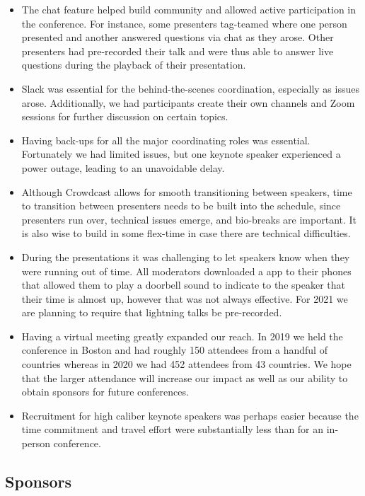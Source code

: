 \begin{itemize}
\item
  The chat feature helped build community and allowed active
  participation in the conference. For instance, some presenters
  tag-teamed where one person presented and another answered questions
  via chat as they arose. Other presenters had pre-recorded their talk
  and were thus able to answer live questions during the playback of
  their presentation.
\item
  Slack was essential for the behind-the-scenes coordination, especially
  as issues arose. Additionally, we had participants create their own
  channels and Zoom sessions for further discussion on certain topics.
\item
  Having back-ups for all the major coordinating roles was essential.
  Fortunately we had limited issues, but one keynote speaker experienced
  a power outage, leading to an unavoidable delay.
\item
  Although Crowdcast allows for smooth transitioning between speakers,
  time to transition between presenters needs to be built into the
  schedule, since presenters run over, technical issues emerge, and
  bio-breaks are important. It is also wise to build in some flex-time
  in case there are technical difficulties.
\item
  During the presentations it was challenging to let speakers know when
  they were running out of time. All moderators downloaded a app to
  their phones that allowed them to play a doorbell sound to indicate to
  the speaker that their time is almost up, however that was not always
  effective. For 2021 we are planning to require that lightning talks be
  pre-recorded.
\item
  Having a virtual meeting greatly expanded our reach. In 2019 we held
  the conference in Boston and had roughly 150 attendees from a handful
  of countries whereas in 2020 we had 452 attendees from 43 countries.
  We hope that the larger attendance will increase our impact as well as
  our ability to obtain sponsors for future conferences.
\item
  Recruitment for high caliber keynote speakers was perhaps easier
  because the time commitment and travel effort were substantially less
  than for an in-person conference.
\end{itemize}

\hypertarget{sponsors}{%
\subsection{Sponsors}\label{sponsors}}

